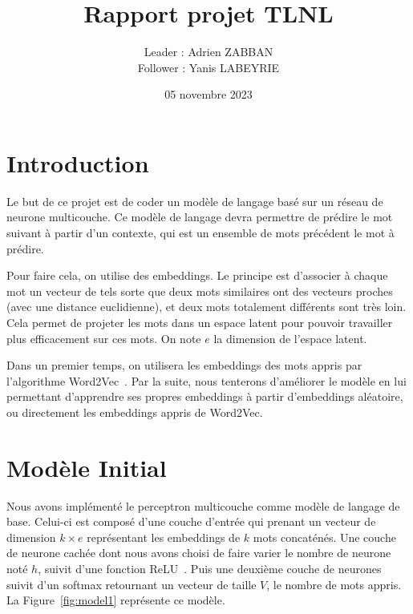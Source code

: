 \documentclass[a4paper]{article}
\title{Rapport projet TLNL}
\author{Leader : Adrien ZABBAN \\ Follower : Yanis LABEYRIE}
\date{05 novembre 2023}
\begin{document}
\maketitle


\section{Introduction}


Le but de ce projet est de coder un modèle de langage basé sur un réseau de neurone multicouche. Ce modèle de langage devra permettre de prédire le mot suivant à partir d'un contexte, qui est un ensemble de mots précédent le mot à prédire. 

Pour faire cela, on utilise des embeddings. Le principe est d'associer à chaque mot un vecteur de tels sorte que deux mots similaires ont des vecteurs proches (avec une distance euclidienne), et deux mots totalement différents sont très loin. Cela permet de projeter les mots dans un espace latent pour pouvoir travailler plus efficacement sur ces mots. On note $e$ la dimension de l'espace latent.

Dans un premier temps, on utilisera les embeddings des mots appris par l'algorithme Word2Vec~\cite{mikolov2013efficient}. Par la suite, nous tenterons d'améliorer le modèle en lui permettant d'apprendre ses propres embeddings à partir d'embeddings aléatoire, ou directement les embeddings appris de Word2Vec.


\section{Modèle Initial}


Nous avons implémenté le perceptron multicouche comme modèle de langage de base. Celui-ci est composé d'une couche d'entrée qui prenant un vecteur de dimension $k \times e$ représentant les embeddings de $k$ mots concaténés. Une couche de neurone cachée dont nous avons choisi de faire varier le nombre de neurone noté $h$, suivit d'une fonction ReLU~\cite{DBLP:journals/corr/abs-1803-08375}. 
Puis une deuxième couche de neurones suivit d'un softmax retournant un vecteur de taille $V$, le nombre de mots appris. La Figure~\ref{fig:model1} représente ce modèle.
\end{document}
